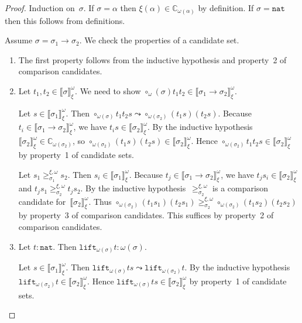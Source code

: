 \documentclass[runningheads,a4paper]{llncs}
\newcommand{\arrtype}{\rightarrow}
\newcommand{\nat}{\mathtt{nat}}
\newcommand{\lift}{\mathtt{lift}}
\newcommand{\Cb}{\mathbb{C}}
\newcommand{\val}[3]{\ensuremath{\llbracket#1\rrbracket_{#2}^{#3}}}
\newcommand{\gteq}[3]{\ensuremath{\ge_{#1}^{#2,#3}}}
\begin{document}
\begin{proof}
  Induction on~$\sigma$. If $\sigma=\alpha$ then $\xi(\alpha) \in
  \Cb_{\omega(\alpha)}$ by definition. If $\sigma=\nat$ then this
  follows from definitions.

  Assume $\sigma=\sigma_1\arrtype\sigma_2$. We check the properties of
  a candidate set.
  \begin{enumerate}
  \item The first property follows from the inductive hypothesis and
    property~2 of comparison candidates.
  \item Let $t_1,t_2 \in \val{\sigma}{\xi}{\omega}$. We need to show
    $\circ_\omega(\sigma) t_1 t_2 \in
    \val{\sigma_1\arrtype\sigma_2}{\xi}{\omega}$.

    Let $s \in \val{\sigma_1}{\xi}{\omega}$. Then
    $\circ_{\omega(\sigma)} t_1 t_2 s \leadsto
    \circ_{\omega(\sigma_2)} (t_1 s) (t_2 s)$. Because $t_i \in
    \val{\sigma_1\arrtype\sigma_2}{\xi}{\omega}$, we have $t_i s \in
    \val{\sigma_2}{\xi}{\omega}$. By the inductive
    hypothesis~$\val{\sigma_2}{\xi}{\omega} \in
    \Cb_{\omega(\sigma_2)}$, so $\circ_{\omega(\sigma_2)} (t_1 s) (t_2
    s) \in \val{\sigma_2}{\xi}{\omega}$. Hence
    $\circ_{\omega(\sigma_2)} t_1 t_2 s \in
    \val{\sigma_2}{\xi}{\omega}$ by property~1 of candidate sets.

    Let $s_1 \gteq{\sigma_1}{\xi}{\omega} s_2$. Then $s_i \in
    \val{\sigma_1}{\xi}{\omega}$. Because $t_j \in
    \val{\sigma_1\arrtype\sigma_2}{\xi}{\omega}$, we have $t_j s_i \in
    \val{\sigma_2}{\xi}{\omega}$ and $t_j s_1
    \gteq{\sigma_2}{\xi}{\omega} t_j s_2$. By the inductive
    hypothesis~$\gteq{\sigma_2}{\xi}{\omega}$ is a comparison
    candidate for~$\val{\sigma_2}{\xi}{\omega}$. Thus
    $\circ_{\omega(\sigma_2)} (t_1 s_1) (t_2 s_1)
    \gteq{\sigma_2}{\xi}{\omega} \circ_{\omega(\sigma_2)} (t_1 s_2)
    (t_2 s_2)$ by property~3 of comparison candidates. This suffices
    by property~2 of comparison candidates.
  \item Let $t : \nat$. Then $\lift_{\omega(\sigma)} t :
    \omega(\sigma)$.

    Let $s \in \val{\sigma_1}{\xi}{\omega}$. Then
    $\lift_{\omega(\sigma)}t s \leadsto \lift_{\omega(\sigma_2)}
    t$. By the inductive hypothesis $\lift_{\omega(\sigma_2)} t \in
    \val{\sigma_2}{\xi}{\omega}$. Hence $\lift_{\omega(\sigma)}t s \in
    \val{\sigma_2}{\xi}{\omega}$ by property~1 of candidate sets.


\end{enumerate}
\end{proof}
\end{document}
